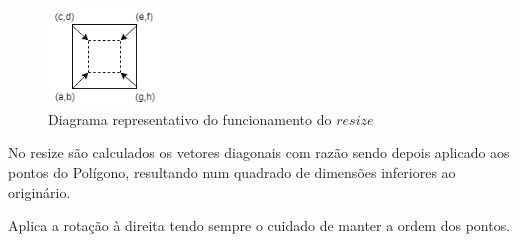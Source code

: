 \documentclass[a4paper]{article}
\newcommand{\Varid}[1]{\mathit{#1}}
\begin{document}
\begin{figure}[H]
\begin{center}
    \includegraphics[width=3cm]{resize} 
    \caption{Diagrama representativo do funcionamento do \ensuremath{\Varid{resize}}}
\end{center}
\end{figure}

\par No resize são calculados os vetores diagonais com razão sendo depois aplicado aos pontos do Polígono, 
resultando num quadrado de dimensões inferiores ao originário.
\bigbreak
\par Aplica a rotação à direita tendo sempre o cuidado de manter a ordem dos pontos.
\end{document}
